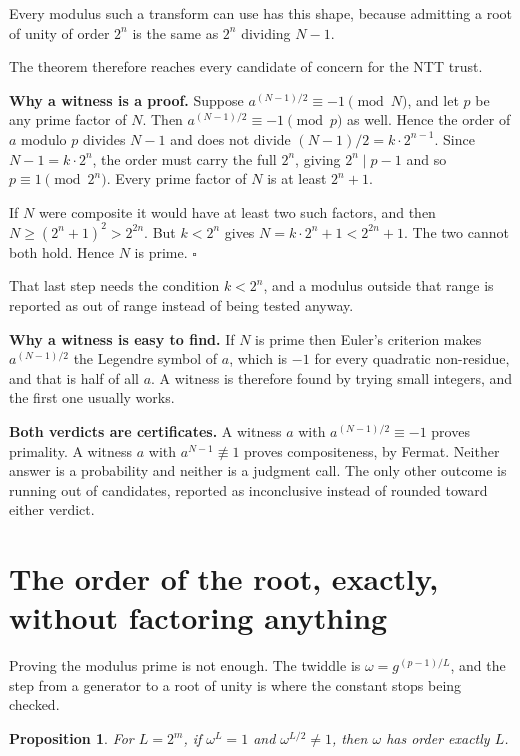 \documentclass{article}
\newtheorem{proposition}{Proposition}
\begin{document}
Every modulus such a transform can use has this shape, because admitting a root of unity of order \(2^n\) is the same as \(2^n\) dividing \(N-1\). 

The theorem therefore reaches every candidate of concern for the NTT trust.

\textbf{Why a witness is a proof.} Suppose \(a^{(N-1)/2} \equiv -1 \pmod N\), and let \(p\) be any prime factor of \(N\). Then \(a^{(N-1)/2} \equiv -1 \pmod p\) as well. Hence the order of \(a\) modulo \(p\) divides \(N-1\) and does not divide \((N-1)/2 = k \cdot 2^{n-1}\). Since \(N - 1 = k \cdot 2^n\), the order must carry the full \(2^n\), giving \(2^n \mid p-1\) and so \(p \equiv 1 \pmod{2^n}\). Every prime factor of \(N\) is at least \(2^n + 1\).

If \(N\) were composite it would have at least two such factors, and then \(N \ge (2^n+1)^2 > 2^{2n}\). But \(k < 2^n\) gives \(N = k \cdot 2^n + 1 < 2^{2n} + 1\). The two cannot both hold. Hence \(N\) is prime. \(\square\)

That last step needs the condition \(k < 2^n\), and a modulus outside that range is reported as out of range instead of being tested anyway.

\textbf{Why a witness is easy to find.} If \(N\) is prime then Euler's criterion makes \(a^{(N-1)/2}\) the Legendre symbol of \(a\), which is \(-1\) for every quadratic non-residue, and that is half of all \(a\). A witness is therefore found by trying small integers, and the first one usually works.

\textbf{Both verdicts are certificates.} A witness \(a\) with \(a^{(N-1)/2} \equiv -1\) proves primality. A witness \(a\) with \(a^{N-1} \not\equiv 1\) proves compositeness, by Fermat. Neither answer is a probability and neither is a judgment call. The only other outcome is running out of candidates, reported as inconclusive instead of rounded toward either verdict.

\section{The order of the root, exactly, without factoring anything}

Proving the modulus prime is not enough. The twiddle is \(\omega = g^{(p-1)/L}\), and the step from a generator to a root of unity is where the constant stops being checked.

\begin{proposition}
For \(L = 2^m\), if \(\omega^L = 1\) and \(\omega^{L/2} \ne 1\), then \(\omega\) has order exactly \(L\).
\end{proposition}
\end{document}
